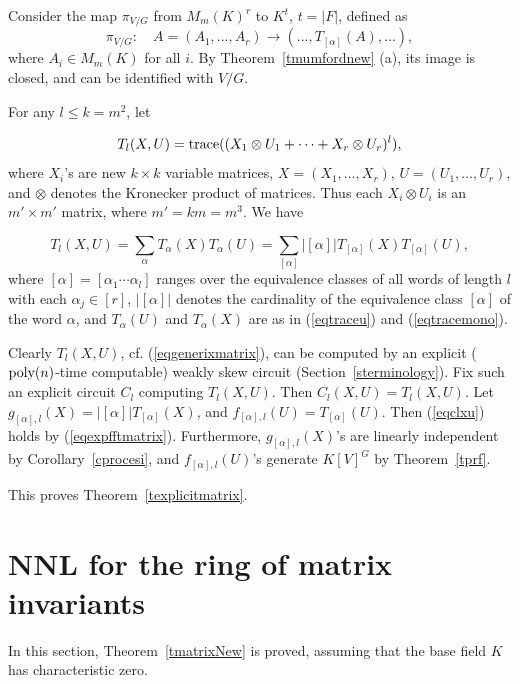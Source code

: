 \documentclass[11pt]{article}
\begin{document}
Consider the map $\pi_{V/G}$ from  $M_m(K)^r$ to $K^t$, $t=|F|$, defined as
\begin{equation}  \label{eqprocesiembed}
\pi_{V/G}: \quad A=(A_1,\ldots,A_r) \rightarrow (\ldots, T_{[\alpha]}(A),\ldots),
\end{equation} 
where $A_i \in M_m(K)$ for all $i$.
By Theorem~\ref{tmumfordnew} (a), its image  is  closed, and 
can be identified with  $V/G$.


For any $l\le k=m^2$, let

\begin{equation} \label{eqgenerixmatrix}
 T_l(X,U)= {\mbox {trace}}((X_1\otimes U_1+ \cdots + X_r \otimes U_r)^l),
\end{equation}
where $X_i$'s are new $k \times k$ variable matrices, $X=(X_1,\ldots,X_r)$,   $U=(U_1,\ldots,U_r)$, and $\otimes$ denotes 
the Kronecker product of matrices. Thus each $X_i \otimes U_i$ is an $m' \times m'$ matrix, where $m'= k m=m^3$.
We have

\begin{equation} \label{eqexpfftmatrix}
T_l(X,U) = \sum_\alpha T_\alpha(X) T_\alpha(U) =\sum_{[\alpha]} |[\alpha]| T_{[\alpha]}(X) T_{[\alpha]}(U),
\end{equation}
where $[\alpha]=[\alpha_1 \cdots \alpha_l]$ ranges over the equivalence classes of all words of length $l$ with each $\alpha_j \in [r]$,
$|[\alpha]|$ denotes the cardinality of the equivalence class $[\alpha]$ of the word $\alpha$, 
and $T_\alpha(U)$ and $T_{\alpha}(X)$ are as  in (\ref{eqtraceu}) 
and (\ref{eqtracemono}).

Clearly $T_l(X,U)$, cf.  (\ref{eqgenerixmatrix}),  can be computed by an explicit (${\mbox {poly}}(n)$-time computable)
weakly skew circuit (Section~\ref{sterminology}). 
Fix such an explicit circuit $C_l$ computing $T_l(X,U)$.  Then 
$C_l(X,U)=T_l(X,U)$. Let   $g_{[\alpha],l}(X)= |[\alpha]| T_{[\alpha]}(X)$, and $f_{[\alpha],l}(U)=T_{[\alpha]}(U)$.
Then (\ref{eqclxu}) holds by (\ref{eqexpfftmatrix}).
Furthermore,  $g_{[\alpha],l}(X)$'s are linearly independent by Corollary~\ref{cprocesi}, and 
$f_{[\alpha],l}(U)$'s generate $K[V]^G$ by Theorem~\ref{tprf}.

This proves Theorem~\ref{texplicitmatrix}. 

\section{NNL for the ring of matrix invariants} \label{sstit} 
In this section, Theorem~\ref{tmatrixNew} is proved, assuming that the base field $K$ has characteristic zero.
\end{document}
